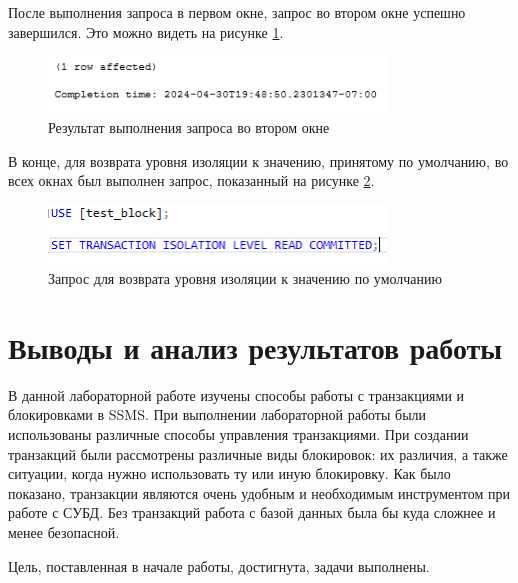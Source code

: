 \documentclass[a4paper, 14pt]{extarticle}
\begin{document}
После выполнения запроса в первом окне, запрос во втором окне успешно
завершился. Это можно видеть на рисунке \ref{fig:task-3-20}.

\begin{figure}[H]
  \centering
  \includegraphics[width=0.8\textwidth]{images/task-3/20.png}
  \caption{Результат выполнения запроса во втором окне}
  \label{fig:task-3-20}
\end{figure}

В конце, для возврата уровня изоляции к значению, принятому по умолчанию, во
всех окнах был выполнен запрос, показанный на рисунке \ref{fig:task-3-21}.

\begin{figure}[H]
  \centering
  \includegraphics[width=0.8\textwidth]{images/task-3/21.png}
  \caption{Запрос для возврата уровня изоляции к значению по умолчанию}
  \label{fig:task-3-21}
\end{figure}

\section{Выводы и анализ результатов работы}

В данной лабораторной работе изучены способы работы с транзакциями и
блокировками в SSMS. При выполнении лабораторной работы были использованы
различные способы управления транзакциями. При создании транзакций были
рассмотрены различные виды блокировок: их различия, а также ситуации, когда
нужно использовать ту или иную блокировку. Как было показано, транзакции
являются очень удобным и необходимым инструментом при работе с СУБД. Без
транзакций работа с базой данных была бы куда сложнее и менее безопасной.

Цель, поставленная в начале работы, достигнута, задачи выполнены.
\end{document}
